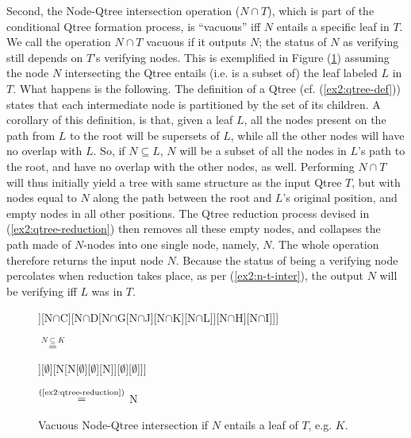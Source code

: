 Second, the Node-Qtree intersection operation ($N\cap T$), which is part of the conditional Qtree formation process, is ``vacuous'' iff $N$ entails a specific leaf in $T$. We call the operation $N \cap T$ vacuous if it outputs $N$; the status of $N$ as verifying still depends on $T$'s verifying nodes. This is exemplified in Figure (\ref{fig2:vacuous-tree-node-inter}) assuming the node $N$ intersecting the Qtree entails (i.e. is a subset of) the leaf labeled $L$ in $T$. What happens is the following. The definition of a Qtree (cf. (\ref{ex2:qtree-def})) states that each intermediate node is partitioned by the set of its children. A corollary of this definition, is that, given a leaf $L$, all the nodes present on the path from $L$ to the root will be supersets of $L$, while all the other nodes will have no overlap with $L$. So, if $N \subseteq L$, $N$ will be a subset of all the nodes in $L$'s path to the root, and have no overlap with the other nodes, as well. Performing $N \cap T$ will thus initially yield a tree with same structure as the input Qtree $T$, but with nodes equal to $N$ along the path between the root and $L$'s original position, and empty nodes in all other positions. The Qtree reduction process devised in (\ref{ex2:qtree-reduction}) then removes all these empty nodes, and collapses the path made of $N$-nodes into one single node, namely, $N$. The whole operation therefore returns the input node $N$. Because the status of being a verifying node percolates when reduction takes place, as per (\ref{ex2:n-t-inter}), the output $N$ will be verifying iff $L$ was in $T$.



\begin{figure}[H]
	\centering
	\begin{minipage}[c]{.45\linewidth}
		\centering
		\begin{forest}
			[N$\cap$A[N$\cap$B[N$\cap$E][N$\cap$F]][N$\cap$C][N$\cap$D[N$\cap$G[N$\cap$J][N$\cap$K][N$\cap$L]][N$\cap$H][N$\cap$I]]]
		\end{forest}
	\end{minipage}
	\begin{minipage}[c]{.05\linewidth}
		\centering
		$\stackrel{N \subseteq K}{=}$
	\end{minipage}
	\begin{minipage}[c]{.25\linewidth}
		\centering
		\begin{forest}
			[N[$\emptyset$[$\emptyset$][$\emptyset$]][$\emptyset$][N[N[$\emptyset$][$\emptyset$][N]][$\emptyset$][$\emptyset$]]]
		\end{forest}
	\end{minipage}
	\begin{minipage}[c]{.1\linewidth}
		\centering
		$\stackrel{(\text{\ref{ex2:qtree-reduction}})}{=}$ N
	\end{minipage}
	\caption{Vacuous Node-Qtree intersection if $N$ entails a leaf of $T$, e.g. $K$.}\label{fig2:vacuous-tree-node-inter}
\end{figure}

